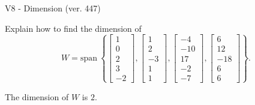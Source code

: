 \begin{exercise}
  \begin{exerciseTitle}V8 - Dimension (ver. 447)\end{exerciseTitle}
  \begin{exerciseStatement}
    Explain how to find the dimension of 
\[W=\mathrm{span}\ \left\{\left[\begin{array}{r}
1 \\
0 \\
2 \\
3 \\
-2
\end{array}\right] , \left[\begin{array}{r}
1 \\
2 \\
-3 \\
1 \\
1
\end{array}\right] , \left[\begin{array}{r}
-4 \\
-10 \\
17 \\
-2 \\
-7
\end{array}\right] , \left[\begin{array}{r}
6 \\
12 \\
-18 \\
6 \\
6
\end{array}\right]\right\}.\]



  \end{exerciseStatement}
  \begin{exerciseAnswer}
   The dimension of \(W\) is  \(2\).
  


  \end{exerciseAnswer}
\end{exercise}